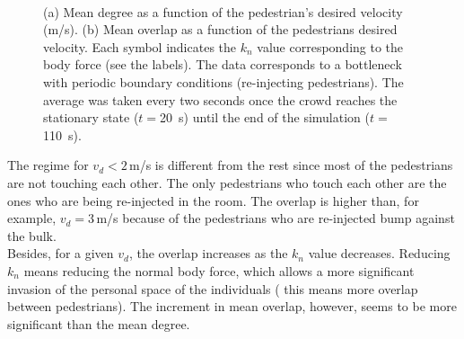 \documentclass[preprint,12pt]{elsarticle}
\begin{document}
\begin{figure}[!htbp]
\centering
    \ 
    \\
\caption[width=0.47\columnwidth]{(a) Mean degree as a function of the pedestrian’s desired velocity (m/s). (b) Mean overlap as a function of the pedestrians desired velocity. Each symbol indicates the $k_n$ value corresponding to the body force (see the labels). The data corresponds to a bottleneck with periodic boundary conditions (re-injecting pedestrians). The average was taken every two seconds once the crowd reaches the stationary state ($t=$20~s) until the end of the simulation ($t=$110~s).}
\label{degree_overlap_vd}
\end{figure}

The regime for $v_d<2\,$m/s is different from the rest since most of the pedestrians are not touching each other. The only pedestrians who touch each other are the ones who are being re-injected in the room. The overlap is higher than, for example, $v_d=3\,$m/s because of the pedestrians who are re-injected bump against the bulk. \\

Besides, for a given $v_d$, the overlap increases as the $k_n$ value decreases. Reducing $k_n$ means reducing the normal body force, which allows a more significant invasion of the personal space of the individuals ( this means more overlap between pedestrians). The increment in mean overlap, however, seems to be more significant than the mean degree. \\  
\end{document}
